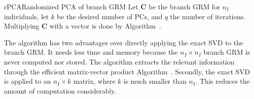 \begin{taocpalg}{rPCA}{Randomized PCA of branch GRM}
{
    Let $\mathbf{C}$ be the branch GRM for $n_I$ individuals,
    let $k$ be the desired number of PCs, and $q$ the number of iterations.
    Multiplying $\mathbf{C}$ with a vector is done by Algorithm~.
}
    


\end{taocpalg}

The algorithm has two advantages over directly applying the exact SVD to the branch GRM.
%
It needs less time and memory because the $n_I \times n_I$ branch GRM is never computed nor stored.
%
The algorithm extracts the relevant information through
the efficient matrix-vector product Algorithm~.
%
Secondly, the exact SVD is applied to an $n_I \times k$ matrix,
where $k$ is much smaller than $n_I$.
%
This reduces the amount of computation considerably.

